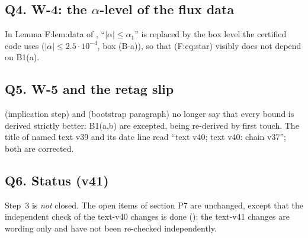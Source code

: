 \subsection*{Q4. W-4: the $\alpha$-level of the flux data}
In Lemma F:lem:data of , ``$|\alpha|\le\alpha_1$'' is replaced by the box level the certified code uses ($|\alpha|\le2.5\cdot10^{-4}$, box (B-a)), so that (F:eq:star) visibly does not depend on B1(a).
\subsection*{Q5. W-5 and the retag slip}
 (implication step) and  (bootstrap paragraph) no longer say that every bound is derived strictly better: B1(a,b) are excepted, being re-derived by first touch. The title of  named text v39 and its date line read ``text v40; text v40: chain v37''; both are corrected.
\subsection*{Q6. Status (v41)}
Step~3 is \emph{not} closed. The open items of section P7 are unchanged, except that the independent check of the text-v40 changes is done (); the text-v41 changes are wording only and have not been re-checked independently.
